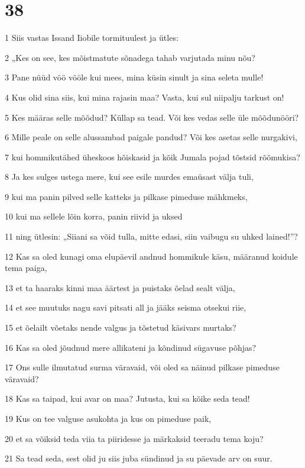 \chapter{38}

\par 1 Siis vastas Issand Iiobile tormituulest ja ütles:
\par 2 „Kes on see, kes mõistmatute sõnadega tahab varjutada minu nõu?
\par 3 Pane nüüd vöö vööle kui mees, mina küsin sinult ja sina seleta mulle!
\par 4 Kus olid sina siis, kui mina rajasin maa? Vasta, kui sul niipalju tarkust on!
\par 5 Kes määras selle mõõdud? Küllap sa tead. Või kes vedas selle üle mõõdunööri?
\par 6 Mille peale on selle alussambad paigale pandud? Või kes asetas selle nurgakivi,
\par 7 kui hommikutähed üheskoos hõiskasid ja kõik Jumala pojad tõstsid rõõmukisa?
\par 8 Ja kes sulges ustega mere, kui see esile murdes emaüsast välja tuli,
\par 9 kui ma panin pilved selle katteks ja pilkase pimeduse mähkmeks,
\par 10 kui ma sellele lõin korra, panin riivid ja uksed
\par 11 ning ütlesin: „Siiani sa võid tulla, mitte edasi, siin vaibugu su uhked lained!”?
\par 12 Kas sa oled kunagi oma elupäevil andnud hommikule käsu, määranud koidule tema paiga,
\par 13 et ta haaraks kinni maa äärtest ja puistaks õelad sealt välja,
\par 14 et see muutuks nagu savi pitsati all ja jääks seisma otsekui riie,
\par 15 et õelailt võetaks nende valgus ja tõstetud käsivars murtaks?
\par 16 Kas sa oled jõudnud mere allikateni ja kõndinud sügavuse põhjas?
\par 17 Ons sulle ilmutatud surma väravaid, või oled sa näinud pilkase pimeduse väravaid?
\par 18 Kas sa taipad, kui avar on maa? Jutusta, kui sa kõike seda tead!
\par 19 Kus on tee valguse asukohta ja kus on pimeduse paik,
\par 20 et sa võiksid teda viia ta piiridesse ja märkaksid teeradu tema koju?
\par 21 Sa tead seda, sest olid ju siis juba sündinud ja su päevade arv on suur.
